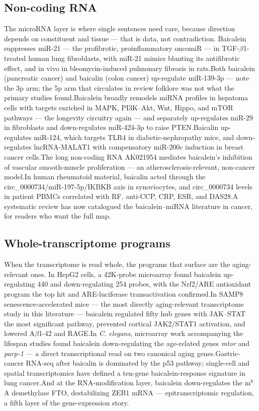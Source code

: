 \documentclass[11pt]{article}
\newcommand{\src}[1]{\allowbreak[#1]}
\begin{document}
\subsection{Non-coding RNA}

The microRNA layer is where single sentences need care, because direction depends on constituent and tissue --- that is data, not contradiction. Baicalein suppresses miR-21 --- the profibrotic, proinflammatory oncomiR --- in TGF-$\beta$1-treated human lung fibroblasts, with miR-21 mimics blunting its antifibrotic effect, and in vivo in bleomycin-induced pulmonary fibrosis in rats.\src{121}\src{111} Both baicalein (pancreatic cancer) and baicalin (colon cancer) up-regulate miR-139-3p --- note the 3p arm; the 5p arm that circulates in review folklore was not what the primary studies found.\src{136}\src{141} Baicalein broadly remodels miRNA profiles in hepatoma cells with targets enriched in MAPK, PI3K--Akt, Wnt, Hippo, and mTOR pathways --- the longevity circuitry again --- and separately up-regulates miR-29 in fibroblasts and down-regulates miR-424-3p to raise PTEN.\src{119}\src{123}\src{120} Baicalin up-regulates miR-124, which targets TLR4 in diabetic-nephropathy mice, and down-regulates lncRNA-MALAT1 with compensatory miR-200c induction in breast cancer cells.\src{141}\src{140} The long non-coding RNA AK021954 mediates baicalein's inhibition of vascular smooth-muscle proliferation --- an atherosclerosis-relevant, non-cancer model.\src{115} In human rheumatoid material, baicalin acted through the circ\_0000734/miR-197-5p/IKBKB axis in synoviocytes, and circ\_0000734 levels in patient PBMCs correlated with RF, anti-CCP, CRP, ESR, and DAS28.\src{159} A systematic review has now catalogued the baicalein--miRNA literature in cancer, for readers who want the full map.\src{152}

\subsection{Whole-transcriptome programs}

When the transcriptome is read whole, the programs that surface are the aging-relevant ones. In HepG2 cells, a 42K-probe microarray found baicalein up-regulating 440 and down-regulating 254 probes, with the Nrf2/ARE antioxidant program the top hit and ARE-luciferase transactivation confirmed.\src{110} In SAMP8 senescence-accelerated mice --- the most directly aging-relevant transcriptome study in this literature --- baicalein regulated fifty hub genes with JAK--STAT the most significant pathway, prevented cortical JAK2/STAT1 activation, and lowered A$\beta$1-42 and RAGE.\src{124} In \textit{C. elegans}, microarray work accompanying the lifespan studies found baicalein down-regulating the age-related genes \textit{mtor} and \textit{parp-1} --- a direct transcriptional read on two canonical aging genes.\src{212} Gastric-cancer RNA-seq after baicalin is dominated by the p53 pathway; single-cell and spatial transcriptomics have defined a ten-gene baicalein-response signature in lung cancer.\src{138}\src{158} And at the RNA-modification layer, baicalein down-regulates the m$^6$A demethylase FTO, destabilizing ZEB1 mRNA --- epitranscriptomic regulation, a fifth layer of the gene-expression story.\src{153}
\end{document}
